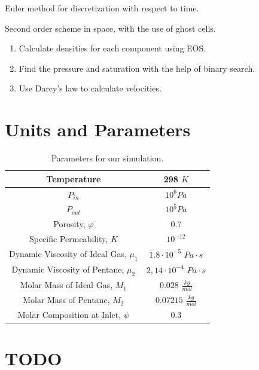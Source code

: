 \documentclass[a4paper,12pt]{article}
\begin{document}
Euler method for discretization with respect to time.

Second order scheme in space, with the use of ghost cells. 

\begin{enumerate}
    \item Calculate densities for each component using EOS.
    \item Find the pressure and saturation with the
        help of binary search.
    \item Use Darcy's law to calculate velocities.
\end{enumerate}

\section{Units and Parameters}

\begin{table}[H]
    \centering
    \caption{Parameters for our simulation.}
    \label{tab:label}
    \begin{tabular}{| c | c |}
        \hline
        Temperature & 298 \(K\) \\
        \hline
        \(P_{in}\) & \(10^6 Pa\) \\
        \hline
        \(P_{out}\) & \(10^5 Pa\) \\
        \hline
        Porosity, \(\varphi\) & 0.7 \\
        \hline
        Specific Permeability, \(K\) & \(10^{-12}\) \\
        \hline
        Dynamic Viscosity of Ideal Gas, \(\mu_1\) &
        \(1.8 \cdot 10^{-5}\) \(Pa \cdot s\) \\
        \hline
        Dynamic Viscosity of Pentane, \(\mu_2\) &
        \(2,14 \cdot 10^{-4}\) \( Pa \cdot s\) \\
        \hline
        Molar Mass of Ideal Gas, \(M_1\) & 
        \(0.028\) \(\frac{kg}{mol}\) \\
        \hline
        Molar Mass of Pentane, \(M_2\) & 
        \(0.07215\) \(\frac{kg}{mol}\) \\
        \hline
        Molar Composition at Inlet, \(\psi\) &
        \(0.3\) \\
        \hline
    \end{tabular}
\end{table}

\section{TODO}
\end{document}

